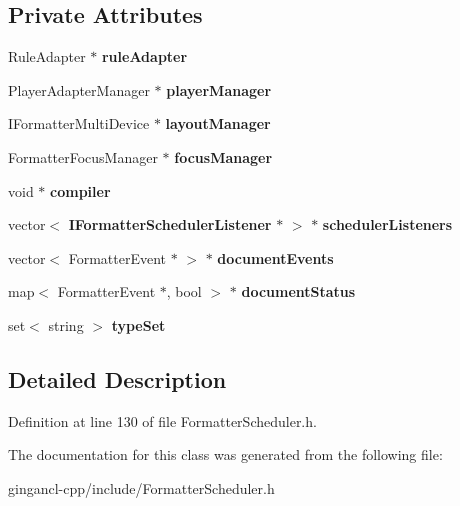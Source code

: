 \subsection*{Private Attributes}
\begin{CompactItemize}
\item 
RuleAdapter $\ast$ {\bf ruleAdapter}\label{classbr_1_1pucrio_1_1telemidia_1_1ginga_1_1ncl_1_1FormatterScheduler_50d33e558d7649f9855c50bfdafee9ff}

\item 
PlayerAdapterManager $\ast$ {\bf playerManager}\label{classbr_1_1pucrio_1_1telemidia_1_1ginga_1_1ncl_1_1FormatterScheduler_4df40f950b752188368d90063891852c}

\item 
IFormatterMultiDevice $\ast$ {\bf layoutManager}\label{classbr_1_1pucrio_1_1telemidia_1_1ginga_1_1ncl_1_1FormatterScheduler_d3c4e0d9d17e334f8c167d3c01b3189d}

\item 
FormatterFocusManager $\ast$ {\bf focusManager}\label{classbr_1_1pucrio_1_1telemidia_1_1ginga_1_1ncl_1_1FormatterScheduler_a41997690dc7b9096171a259c924e3ba}

\item 
void $\ast$ {\bf compiler}\label{classbr_1_1pucrio_1_1telemidia_1_1ginga_1_1ncl_1_1FormatterScheduler_d6d3abac4b9a7f680d64030e2a14731b}

\item 
vector$<$ {\bf IFormatterSchedulerListener} $\ast$ $>$ $\ast$ {\bf schedulerListeners}\label{classbr_1_1pucrio_1_1telemidia_1_1ginga_1_1ncl_1_1FormatterScheduler_86041f459908508c828169bcdb410acc}

\item 
vector$<$ FormatterEvent $\ast$ $>$ $\ast$ {\bf documentEvents}\label{classbr_1_1pucrio_1_1telemidia_1_1ginga_1_1ncl_1_1FormatterScheduler_b4d68f61ec58c904bb569b621c60f134}

\item 
map$<$ FormatterEvent $\ast$, bool $>$ $\ast$ {\bf documentStatus}\label{classbr_1_1pucrio_1_1telemidia_1_1ginga_1_1ncl_1_1FormatterScheduler_c7d4f65c3792da8ebed796aa5de1c367}

\item 
set$<$ string $>$ {\bf typeSet}\label{classbr_1_1pucrio_1_1telemidia_1_1ginga_1_1ncl_1_1FormatterScheduler_145b3afaa194308141d367cc1393d565}

\end{CompactItemize}


\subsection{Detailed Description}




Definition at line 130 of file FormatterScheduler.h.

The documentation for this class was generated from the following file:\begin{CompactItemize}
\item 
gingancl-cpp/include/FormatterScheduler.h\end{CompactItemize}
